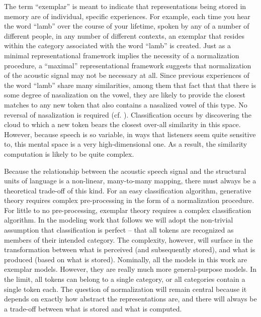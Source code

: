 The term ``exemplar'' is meant to indicate that representations being
stored in memory are of individual, specific experiences. For example,
each time you hear the word “lamb” over the course of your lifetime,
spoken by any of a number of different people, in any number of different
contexts, an exemplar that resides within the category associated
with the word “lamb” is created. Just as a minimal representational
framework implies the necessity of a normalization procedure, a “maximal”
representational framework suggests that normalization of the acoustic
signal may not be necessary at all. Since previous experiences of
the word “lamb” share many similarities, among them that fact
that that there is some degree of nasalization on the vowel, they
are likely to provide the closest matches to any new token that also
contains a nasalized vowel of this type. No reversal of nasalization
is required (cf. \citealt{Johnson1997a}). Classification occurs by
discovering the cloud to which a new token bears the closest over-all
similarity in this space. However, because speech is so variable,
in ways that listeners seem quite sensitive to, this mental space
is a very high-dimensional one. As a result, the similarity computation
is likely to be quite complex. 

Because the relationship between the acoustic speech signal and the
structural units of language is a non-linear, many-to-many mapping,
there must always be a theoretical trade-off of this kind. For an
easy classification algorithm, generative theory requires complex
pre-processing in the form of a normalization procedure. For little
to no pre-processing, exemplar theory requires a complex classification
algorithm. In the modeling work that follows we will adopt the non-trivial
assumption that classification is perfect – that all tokens are recognized
as members of their intended category. The complexity, however, will
surface in the transformation between what is perceived (and subsequently
stored), and what is produced (based on what is stored). Nominally,
all the models in this work are exemplar models. However, they are
really much more general-purpose models. In the limit, all tokens
can belong to a single category, or all categories contain a single
token each. The question of normalization will remain central because
it depends on exactly how abstract the representations are, and there
will always be a trade-off between what is stored and what is computed. 
